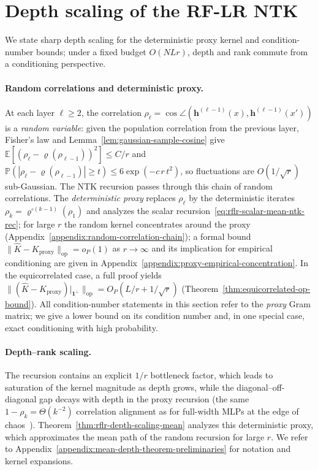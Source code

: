 \section{Depth scaling of the RF-LR NTK}\label{sec:depth-scaling}
We state sharp depth scaling for the deterministic proxy kernel and condition-number bounds; under a fixed budget \(O(NLr)\), depth and rank commute from a conditioning perspective.

\paragraph{Random correlations and deterministic proxy.}\label{subsec:rflr-terjek-generalization}
At each layer \( \ell \ge 2 \), the correlation \( \rho_\ell = \cos\angle(\bm{h}^{(\ell-1)}(x), \bm{h}^{(\ell-1)}(x')) \) is a \emph{random variable}: given the population correlation from the previous layer, Fisher's law and Lemma~\ref{lem:gaussian-sample-cosine} give \( \mathbb{E}[(\rho_\ell - \varrho(\rho_{\ell-1}))^2] \le C/r \) and \( \mathbb{P}(|\rho_\ell - \varrho(\rho_{\ell-1})| \ge t) \le 6\exp(-c\,r\,t^2) \), so fluctuations are \( O(1/\sqrt{r}) \) sub-Gaussian. The NTK recursion passes through this chain of random correlations. The \emph{deterministic proxy} replaces \( \rho_\ell \) by the deterministic iterates \( \rho_k = \varrho^{\circ(k-1)}(\rho_1) \) and analyzes the scalar recursion~\eqref{eq:rflr-scalar-mean-ntk-rec}; for large \(r\) the random kernel concentrates around the proxy (Appendix~\ref{appendix:random-correlation-chain}); a formal bound \(\|\hat{K}-K_{\mathrm{proxy}}\|_{\mathrm{op}}=o_P(1)\) as \(r\to\infty\) and its implication for empirical conditioning are given in Appendix~\ref{appendix:proxy-empirical-concentration}. In the equicorrelated case, a full proof yields \(\|(\hat{K}-K_{\mathrm{proxy}})|_{\mathbf{1}^\perp}\|_{\mathrm{op}}=O_P(L/r+1/\sqrt{r})\) (Theorem~\ref{thm:equicorrelated-op-bound}). All condition-number statements in this section refer to the \emph{proxy} Gram matrix; we give a lower bound on its condition number and, in one special case, exact conditioning with high probability.

\paragraph{Depth--rank scaling.}
The recursion contains an explicit \(1/r\) bottleneck factor, which leads to saturation of the kernel magnitude as depth grows, while the diagonal--off-diagonal gap decays with depth in the proxy recursion (the same \(1-\rho_k=\Theta(k^{-2})\) correlation alignment as for full-width MLPs at the edge of chaos~\cite{terjek2025mlpsateoc,pmlr-v163-hayou22a}). Theorem~\ref{thm:rflr-depth-scaling-mean} analyzes this deterministic proxy, which approximates the mean path of the random recursion for large \(r\). We refer to Appendix~\ref{appendix:mean-depth-theorem-preliminaries} for notation and kernel expansions.

